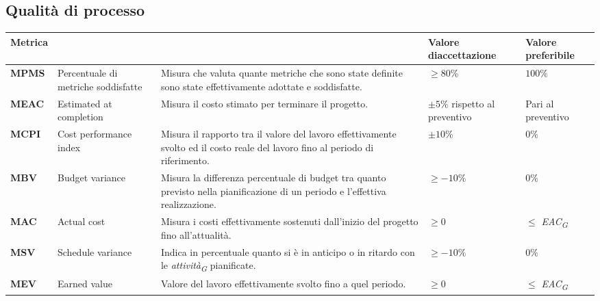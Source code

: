 \subsection{Qualità di processo}

\begin{longtable}{|C{1.9cm}|L{4cm}|L{4cm}|L{2.2cm}|L{2.1cm}|}
\hline
\textbf{Metrica} &  &  & \textbf{Valore di\linebreak accettazione} & {\textbf{Valore \linebreak preferibile}} \\
\hline \hline

\textbf{MPMS} & Percentuale di metriche soddisfatte & Misura che valuta quante metriche che sono state definite sono state effettivamente adottate e soddisfatte. & $\geq 80\%$ & $100\%$ \\
\hline

\textbf{MEAC} & Estimated at completion &  Misura il costo stimato per terminare il progetto.  & $\pm 5\%$ rispetto al preventivo& Pari al preventivo \\
\hline

\textbf{MCPI} & Cost performance index & Misura il rapporto tra il valore del lavoro effettivamente svolto ed il costo reale del lavoro fino al periodo di riferimento. & $\pm 10\%$ & $0\%$ \\
\hline

\textbf{MBV} & Budget variance & Misura la differenza percentuale di budget tra quanto previsto nella pianificazione di un periodo e l’effettiva realizzazione. & $\geq -10\%$ & $0\%$ \\
\hline

\textbf{MAC} & Actual cost & Misura i costi effettivamente sostenuti dall’inizio del progetto fino all’attualità. & $\geq 0 $ & $ \leq$ \textit{EAC}\textsubscript{\textit{G}}  \\
\hline

\textbf{MSV} & Schedule variance & Indica in percentuale quanto si è in anticipo o in ritardo con le \textit{attività}\textsubscript{\textit{G}} pianificate. & $\geq -10\%$ & $0\%$ \\
\hline

\textbf{MEV} & Earned value & Valore del lavoro effettivamente svolto fino a quel periodo. & $\geq 0 $ & $\leq$ \textit{EAC}\textsubscript{\textit{G}} \\
\hline


\end{longtable}
